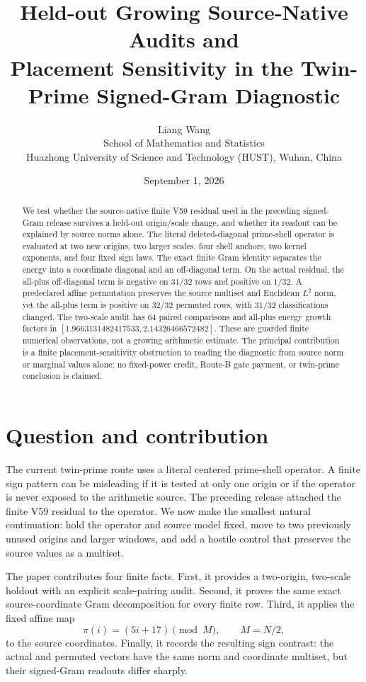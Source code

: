 \documentclass[10pt]{article}
\title{Held-out Growing Source-Native Audits and\\
  \large Placement Sensitivity in the Twin-Prime Signed-Gram Diagnostic}
\author{Liang Wang\\School of Mathematics and Statistics\\Huazhong University of Science and Technology (HUST), Wuhan, China}
\date{September 1, 2026}
\newcommand{\1}{\mathbf 1}
\begin{document}
\maketitle

\begin{abstract}
We test whether the source-native finite V59 residual used in the preceding
signed-Gram release survives a held-out origin/scale change, and whether its
readout can be explained by source norms alone.  The literal deleted-diagonal
prime-shell operator is evaluated at two new origins, two larger scales, four
shell anchors, two kernel exponents, and four fixed sign laws.  The exact finite
Gram identity separates the energy into a coordinate diagonal and an
off-diagonal term.  On the actual residual, the all-plus off-diagonal term is
negative on $31/32$ rows and positive on $1/32$.  A predeclared affine
permutation preserves the source multiset and Euclidean $L^2$ norm, yet the
all-plus term is positive on $32/32$ permuted rows, with $31/32$ classifications
changed.  The two-scale audit has $64$ paired comparisons and all-plus energy
growth factors in $[1.9663131482417533,2.14326466572482]$.  These are guarded
finite numerical observations, not a growing arithmetic estimate.  The
principal contribution is a finite placement-sensitivity obstruction to reading
the diagnostic from source norm or marginal values alone; no fixed-power
credit, Route-B gate payment, or twin-prime conclusion is claimed.
\end{abstract}

\section{Question and contribution}

The current twin-prime route uses a literal centered prime-shell operator.  A
finite sign pattern can be misleading if it is tested at only one origin or if
the operator is never exposed to the arithmetic source.  The preceding release
attached the finite V59 residual to the operator.  We now make the smallest
natural continuation: hold the operator and source model fixed, move to two
previously unused origins and larger windows, and add a hostile control that
preserves the source values as a multiset.

The paper contributes four finite facts.  First, it provides a two-origin,
two-scale holdout with an explicit scale-pairing audit.  Second, it proves the
same exact source-coordinate Gram decomposition for every finite row.  Third,
it applies the fixed affine map
\[
  \pi(i)=(5i+17)\pmod M,\qquad M=N/2,
\]
to the source coordinates.  Finally, it records the resulting sign contrast:
the actual and permuted vectors have the same norm and coordinate multiset,
but their signed-Gram readouts differ sharply.
\end{document}
